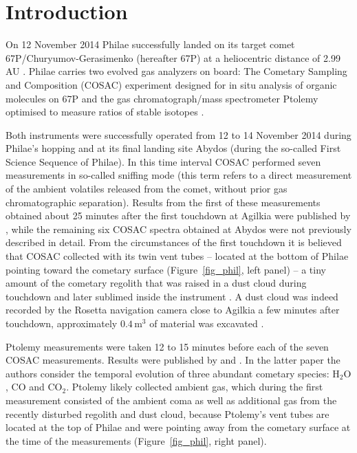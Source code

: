 \documentclass{aa}
\begin{document}
%


%
%



\section{Introduction}

\label{sec_introduction}

On 12 November 2014 Philae successfully landed on its target comet 67P/Churyumov-Gerasimenko 
(hereafter 67P) at a heliocentric distance of 2.99 AU \citep{biele2015}. Philae carries two evolved gas analyzers 
on board: The Cometary Sampling and Composition (COSAC) experiment designed for in situ analysis
of organic molecules on 67P \citep{goesmann2007} and the gas chromatograph/mass spectrometer Ptolemy
optimised to measure ratios of stable isotopes \citep{wright2007}. 

Both instruments were successfully operated from 12 to 14  November 2014 during Philae's hopping and at its final 
landing site Abydos (during the so-called First Science Sequence of Philae). In this time interval
COSAC performed seven measurements in so-called sniffing mode (this term refers to a direct 
measurement of the ambient volatiles released from the comet, without prior gas chromatographic separation). 
Results from the first of these measurements obtained about 25 minutes
after the first touchdown at Agilkia were published by \citet{goesmann2015}, while the remaining 
six COSAC spectra obtained at Abydos were not previously described in detail. From the circumstances of the
first touchdown it is believed that COSAC collected with its twin
vent tubes -- located at the bottom of Philae pointing toward the cometary surface (Figure~\ref{fig_phil}, left panel)
-- a tiny amount of the cometary 
 regolith that was raised in a 
dust cloud during touchdown  and later sublimed inside the instrument \citep{goesmann2015}. A dust cloud was 
indeed recorded by the Rosetta navigation
camera close to Agilkia a few minutes after touchdown, approximately $\mathrm{0.4\,m^3}$ 
of material was excavated \citep{biele2015}.

Ptolemy measurements were taken 12 to 15 minutes before each of the seven COSAC measurements. 
Results were published by \citet{wright2015} and \citet{morse2015}. In the 
latter paper the authors consider the temporal evolution of three abundant cometary species: 
$\mathrm{H_2O}$, CO and $\mathrm{CO_2}$. Ptolemy likely collected ambient gas, which during the first measurement consisted of the ambient coma as well as additional gas from the recently disturbed regolith and dust cloud, because Ptolemy's vent tubes are located at the top of Philae and were pointing away from the cometary surface at the time of the measurements (Figure~\ref{fig_phil}, right panel).
\end{document}
